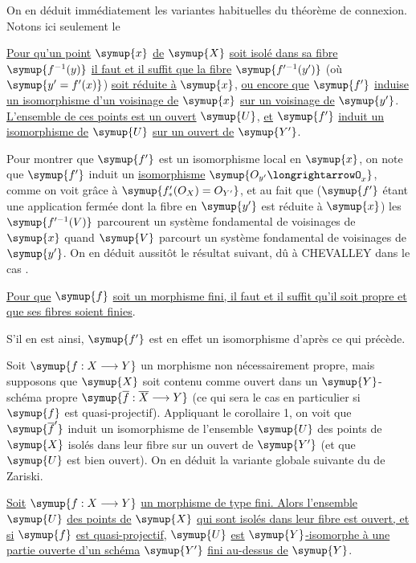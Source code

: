 On en déduit immédiatement les variantes habituelles du théorème de connexion.
Notons ici seulement le

 \uline{Pour qu'un point} $\symup{x}$ \uline{de} $\symup{X}$ \uline{soit isolé dans sa fibre}
$\symup{f^{-1}(y)}$ \uline{il faut et il suffit que la fibre} $\symup{f'^{-1}(y')}$ (où
$\symup{y'=f'(x)}$) \uline{soit réduite à} $\symup{x}$, \uline{ou encore que} $\symup{f'}$ \uline{induise un isomorphisme
d'un voisinage de} $\symup{x}$ \uline{sur un voisinage de} $\symup{y'}$. \uline{L'ensemble de ces points est
un ouvert} $\symup{U}$, \uline{et} $\symup{f'}$ \uline{induit un isomorphisme de} $\symup{U}$ \uline{sur un ouvert de} $\symup{Y'}$.

Pour montrer que $\symup{f'}$ est un isomorphisme local en $\symup{x}$, on note que $\symup{f'}$ induit
un \uline{isomorphisme} $\symup{O_{y'}\longrightarrowO_x}$, comme on voit grâce à
$\symup{f'_*(O_X)=O_{Y'}}$, et au fait que ($\symup{f'}$ étant une application fermée
dont la fibre en $\symup{y'}$ est réduite à $\symup{x}$) les $\symup{f'^{-1}(V)}$ parcourent un
système fondamental de voisinages de $\symup{x}$ quand $\symup{V}$ parcourt un système
fondamental de voisinages de $\symup{y'}$. On en déduit aussitôt le résultat suivant,
dû à CHEVALLEY dans le cas .

 \uline{Pour que} $\symup{f}$ \uline{soit un morphisme fini, il faut et il
suffit qu'il soit propre et que ses fibres soient finies}.

S'il en est ainsi, $\symup{f'}$ est en effet un isomorphisme d'après ce qui précède.

Soit $\symup{f:X\longrightarrow Y}$ un morphisme non nécessairement propre, mais
supposons que $\symup{X}$ soit contenu comme ouvert dans un $\symup{Y}$-schéma propre
$\symup{\overline f:\overline X\longrightarrow Y}$ (ce qui sera le cas en
particulier si $\symup{f}$ est quasi-projectif). Appliquant le corollaire 1, on voit que
$\symup{\overline f'}$ induit un isomorphisme de l'ensemble $\symup{U}$ des points de $\symup{X}$
isolés dans leur fibre sur un ouvert de $\symup{Y'}$ (et que $\symup{U}$ est bien ouvert). On
en déduit la variante globale suivante du  de Zariski.

 \uline{Soit}
$\symup{f:X\longrightarrow Y}$ \uline{un morphisme de type fini. Alors l'ensemble} $\symup{U}$ \uline{des
points de} $\symup{X}$ \uline{qui sont isolés dans leur fibre est ouvert, et si} $\symup{f}$ \uline{est
quasi-projectif}, $\symup{U}$ \uline{est}
$\symup{Y}$\uline{-isomorphe à une partie ouverte d'un schéma} $\symup{Y'}$ \uline{fini au-dessus de} $\symup{Y}$.

